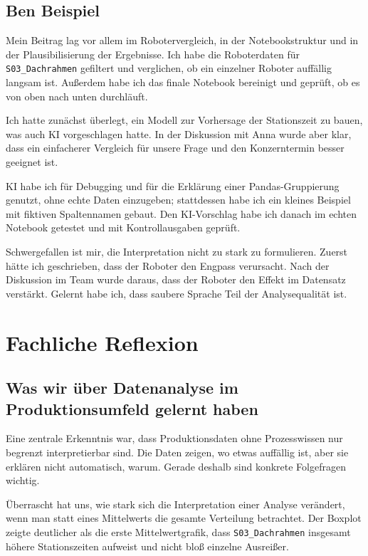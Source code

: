 \documentclass[a4paper, 11pt]{article}
\begin{document}
\subsection*{Ben Beispiel}

Mein Beitrag lag vor allem im Robotervergleich, in der Notebookstruktur und in der Plausibilisierung der Ergebnisse. Ich habe die Roboterdaten für \texttt{S03\_Dachrahmen} gefiltert und verglichen, ob ein einzelner Roboter auffällig langsam ist. Außerdem habe ich das finale Notebook bereinigt und geprüft, ob es von oben nach unten durchläuft.

Ich hatte zunächst überlegt, ein Modell zur Vorhersage der Stationszeit zu bauen, was auch KI vorgeschlagen hatte. In der Diskussion mit Anna wurde aber klar, dass ein einfacherer Vergleich für unsere Frage und den Konzerntermin besser geeignet ist.

KI habe ich für Debugging und für die Erklärung einer Pandas-Gruppierung genutzt, ohne echte Daten einzugeben; stattdessen habe ich ein kleines Beispiel mit fiktiven Spaltennamen gebaut. Den KI-Vorschlag habe ich danach im echten Notebook getestet und mit Kontrollausgaben geprüft.

Schwergefallen ist mir, die Interpretation nicht zu stark zu formulieren. Zuerst hätte ich geschrieben, dass der Roboter den Engpass verursacht. Nach der Diskussion im Team wurde daraus, dass der Roboter den Effekt im Datensatz verstärkt. Gelernt habe ich, dass saubere Sprache Teil der Analysequalität ist.

\section{Fachliche Reflexion}

\subsection{Was wir über Datenanalyse im Produktionsumfeld gelernt haben}

Eine zentrale Erkenntnis war, dass Produktionsdaten ohne Prozesswissen nur begrenzt interpretierbar sind. Die Daten zeigen, wo etwas auffällig ist, aber sie erklären nicht automatisch, warum. Gerade deshalb sind konkrete Folgefragen wichtig.

Überrascht hat uns, wie stark sich die Interpretation einer Analyse verändert, wenn man statt eines Mittelwerts die gesamte Verteilung betrachtet. Der Boxplot zeigte deutlicher als die erste Mittelwertgrafik, dass \texttt{S03\_Dachrahmen} insgesamt höhere Stationszeiten aufweist und nicht bloß einzelne Ausreißer.
\end{document}
